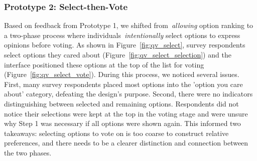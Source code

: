 \subsubsection{Prototype 2: Select-then-Vote}
Based on feedback from Prototype 1, we shifted from~\textit{allowing} option ranking to a two-phase process where individuals~\textit{intentionally} select options to express opinions before voting. As shown in Figure~\ref{fig:qv_select}, survey respondents select options they cared about (Figure~\ref{fig:qv_select_selection}) and the interface positioned these options at the top of the list for voting (Figure~\ref{fig:qv_select_vote}). During this process, we noticed several issues. First, many survey respondents placed most options into the 'option you care about' category, defeating the design's purpose. Second, there were no indicators distinguishing between selected and remaining options. Respondents did not notice their selections were kept at the top in the voting stage and were unsure why Step 1 was necessary if all options were shown again. This informed two takeaways: selecting options to vote on is too coarse to construct relative preferences, and there needs to be a clearer distinction and connection between the two phases.

